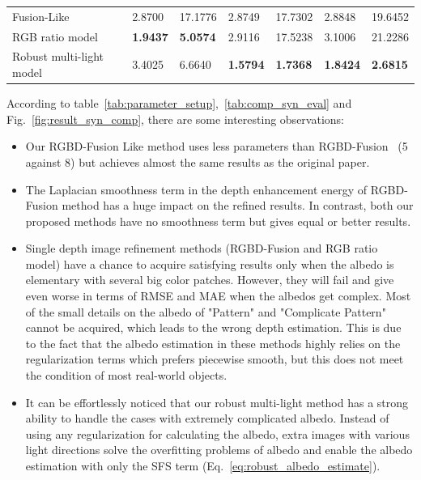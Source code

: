 \begin{table}[!ht]
\begin{tabular}{lllllll}
Fusion-Like                        & 2.8700                   & 17.1776                 & 2.8749                   & 17.7302                 & 2.8848                   & 19.6452                 \\
RGB ratio model                        & \textbf{1.9437}          & \textbf{5.0574}         & 2.9116                   & 17.5238                 & 3.1006                   & 21.2286                 \\
Robust multi-light model               & 3.4025                   & 6.6640                  & \textbf{1.5794}          & \textbf{1.7368}         & \textbf{1.8424}          & \textbf{2.6815}  \\\hline      
\end{tabular}
\end{table}


According to table~\ref{tab:parameter_setup},~\ref{tab:comp_syn_eval} and Fig.~\ref{fig:result_syn_comp}, there are some interesting observations:
\begin{itemize}
    \item Our RGBD-Fusion Like method uses less parameters than RGBD-Fusion~\cite{or2015rgbd} (5 against 8) but achieves almost the same results as the original paper. 
    \item The Laplacian smoothness term in the depth enhancement energy of RGBD-Fusion method has a huge impact on the refined results. In contrast, both our proposed methods have no smoothness term but gives equal or better results.
    \item Single depth image refinement methods (RGBD-Fusion and RGB ratio model) have a chance to acquire satisfying results only when the albedo is elementary with several big color patches. 
    However, they will fail and give even worse in terms of RMSE and MAE when the albedos get complex. 
    Most of the small details on the albedo of "Pattern" and "Complicate Pattern" cannot be acquired, which leads to the wrong depth estimation.
    This is due to the fact that the albedo estimation in these methods highly relies on the regularization terms which prefers piecewise smooth, but this does not meet the condition of most real-world objects.
    \item It can be effortlessly noticed that our robust multi-light method has a strong ability to handle the cases with extremely complicated albedo. 
    Instead of using any regularization for calculating the albedo, extra images with various light directions solve the overfitting problems of albedo and enable the albedo estimation with only the SFS term (Eq.~\ref{eq:robust_albedo_estimate}).
\end{itemize}




